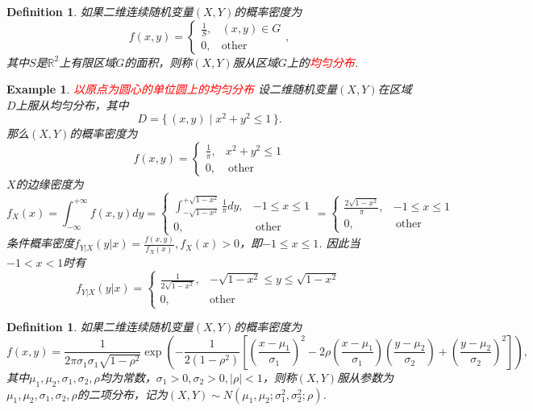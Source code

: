 \documentclass{article}
\newtheorem{example}[theorem]{Example}
\newtheorem{definition}[theorem]{Definition}
\newcommand\Set[2]{\{\,#1\mid#2\,\}} %
\newcommand{\redt}[1]{\textcolor{red}{#1}}
\begin{document}
\begin{definition}
\rm  如果二维连续随机变量$(X,Y)$的概率密度为
$$
f(x,y) = \left\{\begin{array}{ll}
\frac{1}{S}, & (x,y) \in G\\
0, & \text{other}
\end{array}\right. ,
$$
其中$S$是$\mathbb{R}^2$上有限区域$G$的面积，则称$(X,Y)$服从区域$G$上的\redt{均匀分布}.
\end{definition}

\begin{example}
\rm \redt{以原点为圆心的单位圆上的均匀分布} 设二维随机变量$(X,Y)$在区域$D$上服从均匀分布，其中
$$
D=\Set{(x,y)}{x^2 + y ^2 \leq 1}.
$$
那么$(X,Y)$的概率密度为
$$
f(x,y)=\left\{\begin{array}{ll}
\frac{1}{\pi}, & x^2 + y^2 \leq 1 \\
0, & ~\text{other}
\end{array}\right. 
$$
$X$的边缘密度为
$$
f_X(x) = \int_{-\infty}^{+\infty} f(x,y)dy = \left\{ \begin{array}{ll}
\int_{-\sqrt{1-x^2}}^{+\sqrt{1-x^2}} \frac{1}{\pi}dy, & -1 \leq x \leq 1\\
0, & ~\text{other} 
\end{array} \right. = \left\{\begin{array}{ll}
\frac{2\sqrt{1-x^2}}{\pi},& -1 \leq x \leq 1 \\
0, & ~\text{other}
\end{array} \right.
$$
条件概率密度$f_{Y|X}(y|x) = \frac{f(x,y)}{f_X(x)}, f_X(x) > 0$，即$-1 \leq x \leq 1$. 因此当$-1<x<1$时有
$$
f_{Y|X}(y|x) = \left\{\begin{array}{ll}
\frac{1}{2\sqrt{1-x^2}}, &  -\sqrt{1-x^2} \leq y \leq \sqrt{1-x^2} \\
0, & \text{other}
\end{array}\right.
$$
\end{example}

\begin{definition}
\rm 如果二维连续随机变量$(X,Y)$的概率密度为
$$
f(x,y)={\frac {1}{2\pi \sigma _{1}\sigma _{1}{\sqrt {1-\rho ^{2}}}}}\mathrm \exp\left({-{\frac {1}{2(1-\rho ^{2})}}\left[\left({\frac {x-\mu _{1}}{\sigma _{1}}}\right)^{2}-2\rho \left({\frac {x-\mu _{1}}{\sigma _{1}}}\right)\left({\frac {y-\mu _{2}}{\sigma _{2}}}\right)+\left({\frac {y-\mu _{2}}{\sigma _{2}}}\right)^{2}\right]}\right),
$$
其中$\mu_1,\mu_2,\sigma_1,\sigma_2,\rho$均为常数，$\sigma_1 > 0,\sigma_2 > 0, |\rho| < 1$，则称$(X,Y)$服从参数为$\mu_1,\mu_2,\sigma_1,\sigma_2,\rho$的二项分布，记为$(X,Y) \sim N(\mu_1,\mu_2;\sigma_1^2,\sigma_2^2; \rho)$. 
\end{definition}
\end{document}
